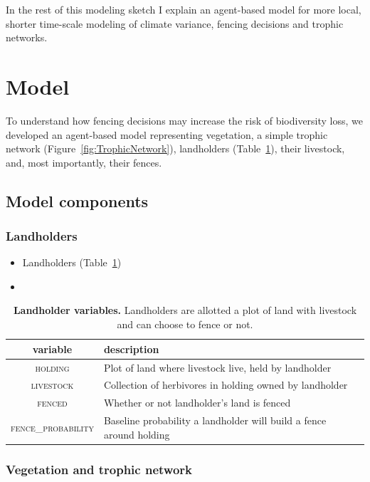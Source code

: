 \documentclass{article}
\theoremstyle{mytheorem}
\theoremstyle{myremark}
\begin{document}
In the rest of this modeling sketch I explain an agent-based model for more
local, shorter time-scale modeling of climate variance, fencing decisions and
trophic networks. 

\section{Model}
\label{sec:abm}

To understand how fencing decisions may increase the risk of biodiversity loss,
we developed an agent-based model representing vegetation, a simple trophic network
(Figure~\ref{fig:TrophicNetwork}),
landholders (Table~\ref{tab:landholders}), their livestock, and, most importantly, 
their fences. 


\subsection{Model components}

\subsubsection{Landholders}

\begin{itemize}
  \item
    Landholders (Table~\ref{tab:landholders})
  \item 
\end{itemize}

\begin{table}[h]
  \caption{\textbf{Landholder variables.} Landholders are allotted a plot of
  land with livestock and can choose to fence or not.}
  \label{tab:landholders}
  \begin{tabular}{cl} \toprule
    variable & description \\ \midrule  
    \textsc{holding} & Plot of land where livestock live, held by landholder \\
    \textsc{livestock} & Collection of herbivores in holding owned by landholder \\
    \textsc{fenced} & Whether or not landholder's land is fenced \\
    \textsc{fence\_probability} & Baseline probability a landholder will build a
    fence around holding \\
    \bottomrule
  \end{tabular} 
\end{table}

\subsubsection{Vegetation and trophic network}
\end{document}
